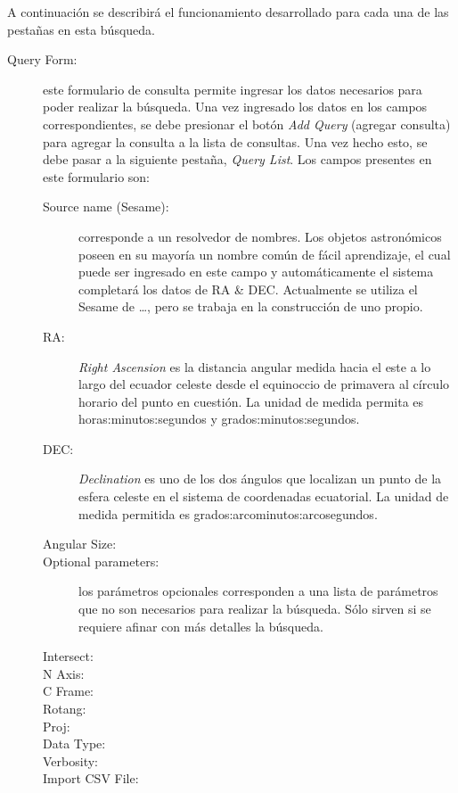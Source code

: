 A continuación se describirá el funcionamiento desarrollado para cada
una de las pestañas en esta búsqueda.

\begin{description}
  \item [Query Form:] este formulario de consulta permite ingresar los
    datos necesarios para poder realizar la búsqueda. Una vez
    ingresado los datos en los campos correspondientes, se debe
    presionar el botón \emph{Add Query} (agregar consulta) para
    agregar la consulta a la lista de consultas. Una vez hecho esto,
    se debe pasar a la siguiente pestaña, \emph{Query List}. Los
    campos presentes en este formulario son:
    \begin{description}
      \item [Source name (Sesame):] corresponde a un resolvedor de
	nombres. Los objetos astronómicos poseen en su mayoría un
	nombre común de fácil aprendizaje, el cual puede ser ingresado
	en este campo y automáticamente el sistema completará los
	datos de RA \& DEC. Actualmente se utiliza el Sesame de
	{\ldots}, pero se trabaja en la construcción de uno propio.
      \item [RA:] \emph{Right Ascension} es la distancia angular
	medida hacia el este a lo largo del ecuador celeste desde el
	equinoccio de primavera al círculo horario del punto en
	cuestión. La unidad de medida permita es
	horas:minutos:segundos y grados:minutos:segundos.
      \item [DEC:] \emph{Declination} es uno de los dos ángulos que
	localizan un punto de la esfera celeste en el sistema de
	coordenadas ecuatorial. La unidad de medida permitida es
	grados:arcominutos:arcosegundos.
      \item [Angular Size:] 
      \item [Optional parameters:] los parámetros opcionales
	corresponden a una lista de parámetros que no son necesarios
	para realizar la búsqueda. Sólo sirven si se requiere afinar
	con más detalles la búsqueda.
      \item [Intersect:]
      \item [N Axis:]
      \item [C Frame:]
      \item [Rotang:]
      \item [Proj:]
      \item [Data Type:]
      \item [Verbosity:]
      \item [Import CSV File:]
    \end{description}  

\end{description}
